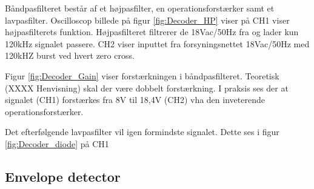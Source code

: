 Båndpasfilteret består af et højpasfilter, en operationsforstærker samt et lavpasfilter. 
Oscilloscop billede på figur \ref{fig:Decoder_HP} viser på CH1 viser højpasfilterets funktion. Højpasfilteret filtrerer de 18Vac/50Hz fra og lader kun 120kHz signalet passere. CH2 viser inputtet fra forsyningsnettet 18Vac/50Hz med 120kHZ burst ved hvert zero cross.

Figur \ref{fig:Decoder_Gain} viser forstærkningen i båndpasfilteret. Teoretisk (XXXX Henvisning) skal der være dobbelt forstærkning. I praksis ses der at signalet (CH1) forstærkes fra 8V til 18,4V (CH2) vha den inveterende operationsforstærker.

Det efterfølgende lavpasfilter vil igen formindste signalet. Dette ses i figur \ref{fig:Decoder_diode} på CH1 


\subsection{Envelope detector}

